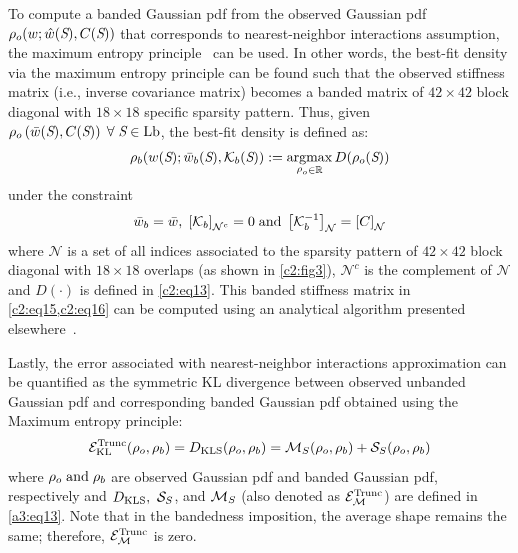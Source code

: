 To compute a banded Gaussian pdf from the observed Gaussian pdf $\rho_{o}(w;\hat{w}({\textit{S}}),C({\textit{S}}))$ that corresponds to nearest-neighbor interactions assumption, the maximum entropy principle~\cite{jaynes1,jaynes2} can be used.
In other words, the best-fit density via the maximum entropy principle can be found such that the observed stiffness matrix (i.e., inverse covariance matrix) becomes a banded matrix of $42 \times 42$ block diagonal with $18 \times 18$ specific sparsity pattern. 
Thus, given $\rho_{o}\left(\bar{w}({\textit{S}}),C({\textit{S}})\right) \; \forall \; {\textit{S}} \in {\text{Lb}}$, the best-fit density is defined as:
\begin{equation}
\rho_{b}(w({\textit{S}}); \bar{w}_{b}({\textit{S}}), {\mathcal K}_{b}({\textit{S}})) := \operatorname*{argmax}_{\substack \rho_o \in {\mathbb R} } D(\rho_o({\textit{S}}))
\label{c2:eq15}
\end{equation}
under the constraint 
 \begin{equation}
 \bar{w}_{b} = \bar{w}, \; \left[{\mathcal K}_b\right]_{\mathcal{N}^c} = 0 \; \text{and} \; \left[{\mathcal K}_{b}^{-1}\right]_{\mathcal{N}} =
 \left[C\right]_{\mathcal{N}}
\label{c2:eq16}
\end{equation}
where $\mathcal{N}$ is a set of all indices associated to  the sparsity pattern of $42 \times 42$ block diagonal with  $18 \times 18$ overlaps (as shown in \cref{c2:fig3}), $\mathcal{N}^c$ is the complement of $\mathcal{N}$ and $D(\cdot)$ is defined in \cref{c2:eq13}.
This banded stiffness matrix in \cref{c2:eq15,c2:eq16} can be computed using an analytical algorithm presented elsewhere~\cite{patelithesis,glowackithesis}.  

Lastly, the error associated with nearest-neighbor interactions approximation can be quantified as the symmetric KL divergence between observed unbanded Gaussian pdf and corresponding banded Gaussian pdf obtained using the Maximum entropy principle:
\begin{equation}
{\mathcal E}_{\text{KL}}^{\text{Trunc}}(\rho_o,\rho_b) = D_{\text{KLS}}(\rho_o,\rho_b) = \mathcal{M}_{S}(\rho_o,\rho_b) + {\mathcal S}_{S}(\rho_o,\rho_b)
\label{error4band}
\end{equation}
where $\rho_o {\;\text{and\;}} \rho_b$ are observed Gaussian pdf and banded Gaussian pdf, respectively and $D_{\text{KLS}}, \ \S_S$, and $\mathcal{M}_S$ (also denoted as ${\mathcal E}_{\mathcal{M}}^{\text{Trunc}}$) are defined in \cref{a3:eq13}. 
Note that in the bandedness imposition, the average shape remains the same; therefore, ${\mathcal E}_{\mathcal{M}}^{\text{Trunc}}$ is zero.

